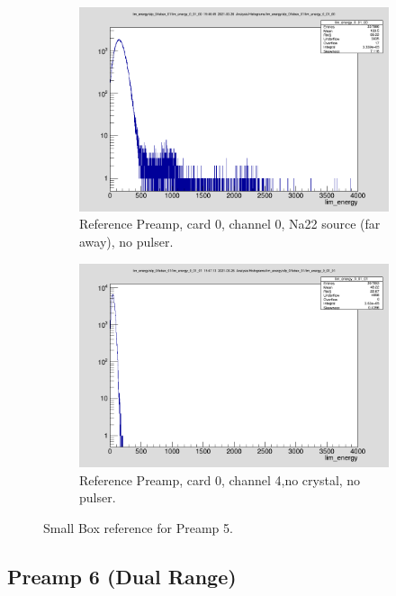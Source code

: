 \documentclass{report}
\begin{document}
\begin{figure}[!htb]
  \centering
  \begin{subfigure}[b]{0.45\textwidth}
    \includegraphics[width=\linewidth]{preamp5_ref_ch0.png}
          \caption{Reference Preamp, card 0, channel 0, Na22 source (far away), no pulser.}
  \end{subfigure}
  \begin{subfigure}[b]{0.4\textwidth}
    \includegraphics[width=\linewidth]{preamp5_ref_ch1_no_crystal.png}
    \caption{Reference Preamp, card 0, channel 4,no crystal, no pulser.}
  \end{subfigure}
  \caption{Small Box reference for Preamp 5.}
\end{figure}
\newpage
\clearpage




\subsection{Preamp 6 (Dual Range)}
\end{document}
